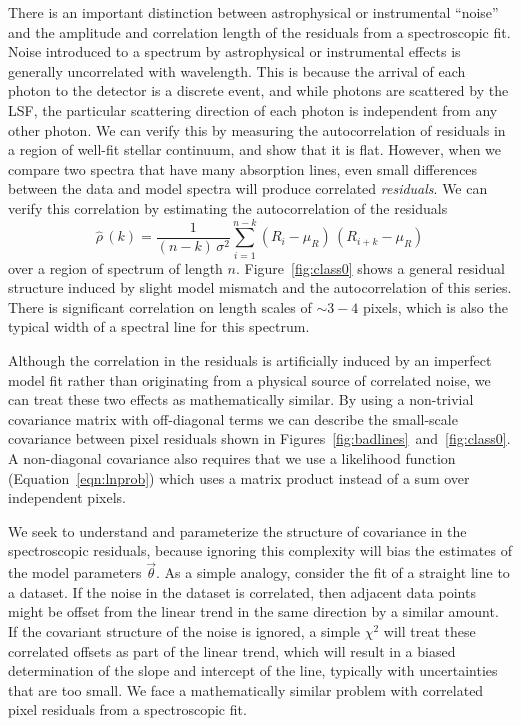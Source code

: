 \documentclass[preprint]{aastex} %
\newcommand{\vt}{\vec{\theta}}
\begin{document}
There is an important distinction between astrophysical or instrumental ``noise'' and the amplitude and correlation length of the residuals from a spectroscopic fit. Noise introduced to a spectrum by astrophysical or instrumental effects is generally uncorrelated with wavelength. This is because the arrival of each photon to the detector is a discrete event, and while photons are scattered by the LSF, the particular scattering direction of each photon is independent from any other photon. We can verify this by measuring the autocorrelation of residuals in a region of well-fit stellar continuum, and show that it is flat. However, when we compare two spectra that have many absorption lines, even small differences between the data and model spectra will produce correlated \emph{residuals}. We can verify this correlation by estimating the autocorrelation of the residuals
\begin{equation}
  \hat{\rho}\,(k) = \frac{1}{(n - k)\,\sigma^2} \sum_{i = 1}^{n - k} (R_i - \mu_R)\,(R_{i+k} - \mu_R)
  \label{eqn:autocorrelation}
\end{equation}
over a region of spectrum of length $n$. Figure~\ref{fig:class0} shows a general residual structure induced by slight model mismatch and the autocorrelation of this series. There is significant correlation on length scales of $\sim 3 -4$ pixels, which is also the typical width of a spectral line for this spectrum.

Although the correlation in the residuals is artificially induced by an
imperfect model fit rather than originating from a physical source of
correlated noise, we can treat these two effects as mathematically similar. By
using a non-trivial covariance matrix with off-diagonal terms we can describe
the small-scale covariance between pixel residuals shown in
Figures~\ref{fig:badlines}~and~\ref{fig:class0}. A non-diagonal covariance also
requires that we use  a likelihood function (Equation~\ref{eqn:lnprob}) which
uses a matrix product instead of a sum over independent pixels.

We seek to understand and parameterize the structure of covariance in the
spectroscopic residuals, because ignoring this complexity will bias the estimates of
the model parameters $\vt$. As a simple analogy, consider the fit of a straight
line to a dataset.  If the noise in the dataset is correlated, then adjacent
data points might be offset from the linear trend in the same direction by a
similar amount.  If the covariant structure of the noise is ignored, a simple
$\chi^2$ will treat these correlated offsets as part of the linear trend, which
will result in a biased determination of the slope and intercept of the line,
typically with uncertainties that are too small. We face a mathematically similar problem with 
correlated pixel residuals from a spectroscopic fit.
\end{document}
